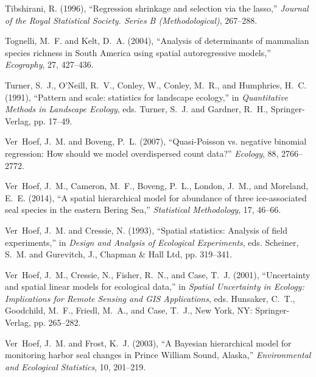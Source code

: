 \documentclass[11pt, titlepage]{article}\usepackage[]{graphicx}\usepackage[]{color}
\begin{document}
\begin{spacing}{1.9}
\begin{flushleft}
\begin{thebibliography}{126}
Tibshirani, R. (1996), \enquote{Regression shrinkage and selection via the
  lasso,} \textit{Journal of the Royal Statistical Society. Series B
  (Methodological)}, 267--288.

Tognelli, M.~F. and Kelt, D.~A. (2004), \enquote{Analysis of determinants of
  mammalian species richness in South America using spatial autoregressive
  models,} \textit{Ecography}, 27, 427--436.

Turner, S.~J., O'Neill, R.~V., Conley, W., Conley, M.~R., and Humphries, H.~C.
  (1991), \enquote{Pattern and scale: statistics for landscape ecology,} in
  \textit{Quantitative Methods in Landscape Ecology}, eds. Turner, S.~J. and
  Gardner, R.~H., Springer-Verlag, pp. 17--49.

Ver~Hoef, J.~M. and Boveng, P.~L. (2007), \enquote{Quasi-Poisson vs. negative
  binomial regression: How should we model overdispersed count data?}
  \textit{Ecology}, 88, 2766--2772.

Ver~Hoef, J.~M., Cameron, M.~F., Boveng, P.~L., London, J.~M., and Moreland,
  E.~E. (2014), \enquote{A spatial hierarchical model for abundance of three
  ice-associated seal species in the eastern Bering Sea,} \textit{Statistical
  Methodology}, 17, 46--66.

Ver~Hoef, J.~M. and Cressie, N. (1993), \enquote{Spatial statistics: {A}nalysis
  of field experiments,} in \textit{Design and Analysis of Ecological
  Experiments}, eds. Scheiner, S.~M. and Gurevitch, J., Chapman \& Hall Ltd,
  pp. 319--341.

Ver~Hoef, J.~M., Cressie, N., Fisher, R.~N., and Case, T.~J. (2001),
  \enquote{Uncertainty and spatial linear models for ecological data,} in
  \textit{Spatial Uncertainty in Ecology: Implications for Remote Sensing and
  GIS Applications}, eds. Hunsaker, C.~T., Goodchild, M.~F., Friedl, M.~A., and
  Case, T.~J., New York, NY: Springer-Verlag, pp. 265--282.

Ver~Hoef, J.~M. and Frost, K.~J. (2003), \enquote{A {B}ayesian hierarchical
  model for monitoring harbor seal changes in {P}rince {W}illiam {S}ound,
  {A}laska,} \textit{Environmental and Ecological Statistics}, 10, 201--219.


\end{thebibliography}
\end{flushleft}
\end{spacing}
\end{document}
